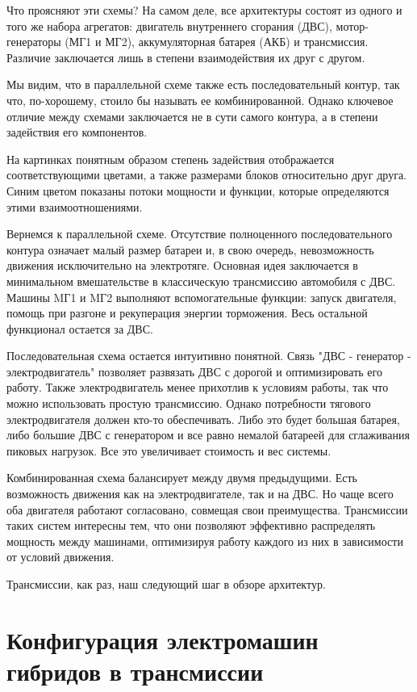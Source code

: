 Что проясняют эти схемы? На самом деле, все архитектуры состоят из одного и того же набора агрегатов: двигатель внутреннего сгорания (ДВС), мотор-генераторы (МГ1 и МГ2), аккумуляторная батарея (АКБ) и трансмиссия. Различие заключается лишь в степени взаимодействия их друг с другом.

Мы видим, что в параллельной схеме также есть последовательный контур, так что, по-хорошему, стоило бы называть ее комбинированной. Однако ключевое отличие между схемами заключается не в сути самого контура, а в степени задействия его компонентов.

На картинках понятным образом степень задействия отображается соответствующими цветами, а также размерами блоков относительно друг друга. Синим цветом показаны потоки мощности и функции, которые определяются этими взаимоотношениями.

Вернемся к параллельной схеме. Отсутствие полноценного последовательного контура означает малый размер батареи и, в свою очередь, невозможность движения исключительно на электротяге. Основная идея заключается в минимальном вмешательстве в классическую трансмиссию автомобиля с ДВС. Машины MГ1 и MГ2 выполняют вспомогательные функции: запуск двигателя, помощь при разгоне и рекуперация энергии торможения. Весь остальной функционал остается за ДВС.

\newpage

Последовательная схема остается интуитивно понятной. Связь "ДВС - генератор - электродвигатель" позволяет развязать ДВС с дорогой и оптимизировать его работу. Также электродвигатель менее прихотлив к условиям работы, так что можно использовать простую трансмиссию. Однако потребности тягового электродвигателя должен кто-то обеспечивать. Либо это будет большая батарея, либо большие ДВС с генератором и все равно немалой батареей для сглаживания пиковых нагрузок. Все это увеличивает стоимость и вес системы.

Комбинированная схема балансирует между двумя предыдущими. Есть возможность движения как на электродвигателе, так и на ДВС. Но чаще всего оба двигателя работают согласовано, совмещая свои преимущества. Трансмиссии таких систем интересны тем, что они позволяют эффективно распределять мощность между машинами, оптимизируя работу каждого из них в зависимости от условий движения.

Трансмиссии, как раз, наш следующий шаг в обзоре архитектур.

\section{Конфигурация электромашин гибридов в трансмиссии}

